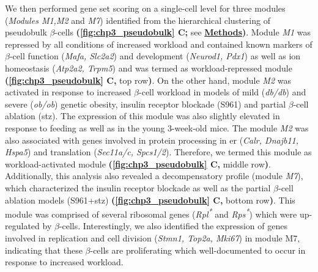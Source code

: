 \par We then performed gene set scoring on a single-cell level for three modules (\textit{Modules M1,M2} and \textit{M7}) identified from the hierarchical clustering of pseudobulk $\beta$-cells \textbf{(\autoref{fig:chp3_pseudobulk} C;} see \hyperref[subsubsec:met_chp3_scoring]{\textbf{Methods}}\textbf{)}. Module \textit{M1} was repressed by all conditions of increased workload and contained known markers of $\beta$-cell function (\textit{Mafa, Slc2a2}) and development (\textit{Neurod1, Pdx1}) as well as ion homeostasis (\textit{Atp2a2, Trpm5}) and was termed as workload-repressed module \textbf{(\autoref{fig:chp3_pseudobulk} C,} top row\textbf{)}. On the other hand, module \textit{M2} was activated in response to increased $\beta$-cell workload in models of mild (\textit{db/db}) and severe (\textit{ob/ob}) genetic obesity, insulin receptor blockade (S961) and partial $\beta$-cell ablation (\gls{stz}). The expression of this module was also slightly elevated in response to feeding as well as in the young 3-week-old mice. The module \textit{M2} was also associated with genes involved in protein processing in \gls{er} (\textit{Calr, Dnajb11, Hspa5}) and translation (\textit{Sec11a/c, Spcs1/2}). Therefore, we termed this module as workload-activated module \textbf{(\autoref{fig:chp3_pseudobulk} C,} middle row\textbf{)}. Additionally, this analysis also revealed a decompensatory profile (module \textit{M7}), which characterized the insulin receptor blockade as well as the partial $\beta$-cell ablation models (S961+\gls{stz}) \textbf{(\autoref{fig:chp3_pseudobulk} C,} bottom row\textbf{)}. This module was comprised of several ribosomal genes (\textit{Rpl\textsuperscript{*}} and \textit{Rps\textsuperscript{*}}) which were up-regulated by $\beta$-cells. Interestingly, we also identified the expression of genes involved in  replication and cell division (\textit{Stmn1, Top2a, Mki67}) in module M7, indicating that these $\beta$-cells are proliferating which well-documented to occur in response to increased workload.\\


